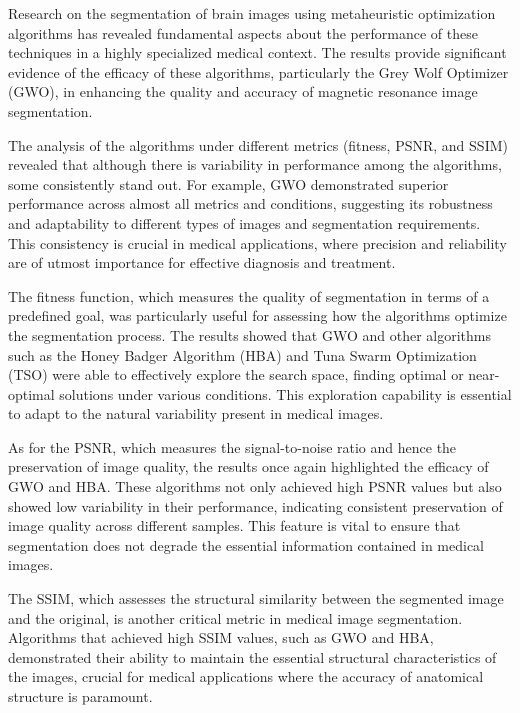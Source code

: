 \documentclass{elsarticle}
\begin{document}
\noindent Research on the segmentation of brain images using metaheuristic optimization algorithms has revealed fundamental aspects about the performance of these techniques in a highly specialized medical context. The results provide significant evidence of the efficacy of these algorithms, particularly the Grey Wolf Optimizer (GWO), in enhancing the quality and accuracy of magnetic resonance image segmentation.

\noindent The analysis of the algorithms under different metrics (fitness, PSNR, and SSIM) revealed that although there is variability in performance among the algorithms, some consistently stand out. For example, GWO demonstrated superior performance across almost all metrics and conditions, suggesting its robustness and adaptability to different types of images and segmentation requirements. This consistency is crucial in medical applications, where precision and reliability are of utmost importance for effective diagnosis and treatment.

\noindent The fitness function, which measures the quality of segmentation in terms of a predefined goal, was particularly useful for assessing how the algorithms optimize the segmentation process. The results showed that GWO and other algorithms such as the Honey Badger Algorithm (HBA) and Tuna Swarm Optimization (TSO) were able to effectively explore the search space, finding optimal or near-optimal solutions under various conditions. This exploration capability is essential to adapt to the natural variability present in medical images.

\noindent As for the PSNR, which measures the signal-to-noise ratio and hence the preservation of image quality, the results once again highlighted the efficacy of GWO and HBA. These algorithms not only achieved high PSNR values but also showed low variability in their performance, indicating consistent preservation of image quality across different samples. This feature is vital to ensure that segmentation does not degrade the essential information contained in medical images.

\noindent The SSIM, which assesses the structural similarity between the segmented image and the original, is another critical metric in medical image segmentation. Algorithms that achieved high SSIM values, such as GWO and HBA, demonstrated their ability to maintain the essential structural characteristics of the images, crucial for medical applications where the accuracy of anatomical structure is paramount.
\end{document}
